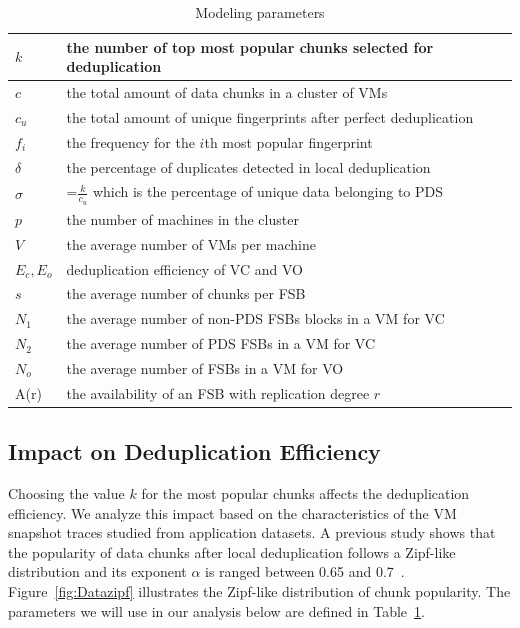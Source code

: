 \begin{table}[htbp]
\centering
\tabcolsep=0.11cm
\begin{tabular}{|p{1.0cm}|p{5.75cm}|}
\hline
$k$ &  the number of top most popular chunks selected for deduplication\\ 
\hline
$c$ &  the total amount of data chunks in a cluster of VMs\\ 
\hline
$c_u$ &  the total amount of unique fingerprints after perfect  deduplication\\
\hline
$f_i$ &  the frequency for the $i$th most popular fingerprint\\
\hline
$\delta$ &  the percentage of duplicates detected in local deduplication\\
\hline
$\sigma$ & =$\frac{k}{c_u}$ which is  the percentage of unique data  belonging to  PDS\\
\hline
$p$ & the number of machines in the cluster\\
\hline
$V$ & the average number of VMs per machine\\
\hline
$E_c, E_o$ & deduplication efficiency of VC and VO \\
\hline
$s$ & the average number of chunks per FSB\\
\hline
$N_1$ & the average number  of non-PDS FSBs blocks in a VM for VC\\
\hline
$N_2$ & the average number  of PDS FSBs in a VM for VC\\
\hline
$N_o$ & the average number  of FSBs  in a VM for VO\\
\hline
A(r) & the availability of an FSB  with replication degree $r$\\
\hline
\end{tabular}
\caption{Modeling  parameters}
\label{tab:symbol}
\end{table}

\subsection{Impact on Deduplication Efficiency}
Choosing the value $k$ for the most popular chunks affects the deduplication efficiency.
We analyze this impact based on the characteristics  of the VM snapshot traces
studied from  application datasets.
A previous study shows that the popularity of data chunks after local deduplication follows 
a Zipf-like distribution\cite{Breslau1999a} and its
exponent $\alpha$ is ranged between 0.65  and  0.7~\cite{WeiZhangIEEE}. 
Figure~\ref{fig:Datazipf} illustrates the Zipf-like distribution of chunk popularity.
The parameters we will use in our analysis below are defined in
Table~\ref{tab:symbol}. 


